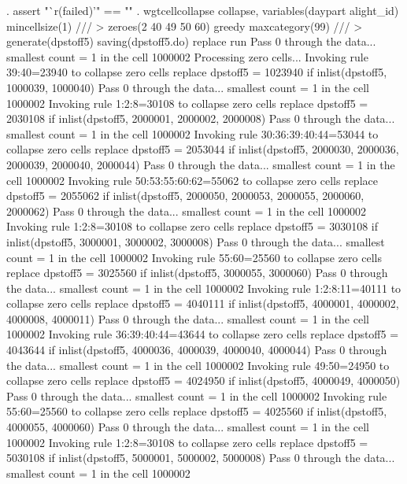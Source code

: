 . assert "`r(failed)'" == ""      
{\smallskip}
. wgtcellcollapse collapse, variables(daypart alight_id) mincellsize(1) ///
>         zeroes(2 40 49 50 60) greedy maxcategory(99) ///
>         generate(dpstoff5) saving(dpstoff5.do) replace run
Pass 0 through the data...
  smallest count = 1 in the cell      1000002
{\smallskip}
Processing zero cells...
{\smallskip}
  Invoking rule 39:40=23940 to collapse zero cells
  replace dpstoff5 = 1023940 if inlist(dpstoff5, 1000039, 1000040)
Pass 0 through the data...
  smallest count = 1 in the cell      1000002
  Invoking rule 1:2:8=30108 to collapse zero cells
  replace dpstoff5 = 2030108 if inlist(dpstoff5, 2000001, 2000002, 2000008)
Pass 0 through the data...
  smallest count = 1 in the cell      1000002
  Invoking rule 30:36:39:40:44=53044 to collapse zero cells
  replace dpstoff5 = 2053044 if inlist(dpstoff5, 2000030, 2000036, 2000039, 2000040, 2000044)
Pass 0 through the data...
  smallest count = 1 in the cell      1000002
  Invoking rule 50:53:55:60:62=55062 to collapse zero cells
  replace dpstoff5 = 2055062 if inlist(dpstoff5, 2000050, 2000053, 2000055, 2000060, 2000062)
Pass 0 through the data...
  smallest count = 1 in the cell      1000002
  Invoking rule 1:2:8=30108 to collapse zero cells
  replace dpstoff5 = 3030108 if inlist(dpstoff5, 3000001, 3000002, 3000008)
Pass 0 through the data...
  smallest count = 1 in the cell      1000002
  Invoking rule 55:60=25560 to collapse zero cells
  replace dpstoff5 = 3025560 if inlist(dpstoff5, 3000055, 3000060)
Pass 0 through the data...
  smallest count = 1 in the cell      1000002
  Invoking rule 1:2:8:11=40111 to collapse zero cells
  replace dpstoff5 = 4040111 if inlist(dpstoff5, 4000001, 4000002, 4000008, 4000011)
Pass 0 through the data...
  smallest count = 1 in the cell      1000002
  Invoking rule 36:39:40:44=43644 to collapse zero cells
  replace dpstoff5 = 4043644 if inlist(dpstoff5, 4000036, 4000039, 4000040, 4000044)
Pass 0 through the data...
  smallest count = 1 in the cell      1000002
  Invoking rule 49:50=24950 to collapse zero cells
  replace dpstoff5 = 4024950 if inlist(dpstoff5, 4000049, 4000050)
Pass 0 through the data...
  smallest count = 1 in the cell      1000002
  Invoking rule 55:60=25560 to collapse zero cells
  replace dpstoff5 = 4025560 if inlist(dpstoff5, 4000055, 4000060)
Pass 0 through the data...
  smallest count = 1 in the cell      1000002
  Invoking rule 1:2:8=30108 to collapse zero cells
  replace dpstoff5 = 5030108 if inlist(dpstoff5, 5000001, 5000002, 5000008)
Pass 0 through the data...
  smallest count = 1 in the cell      1000002
